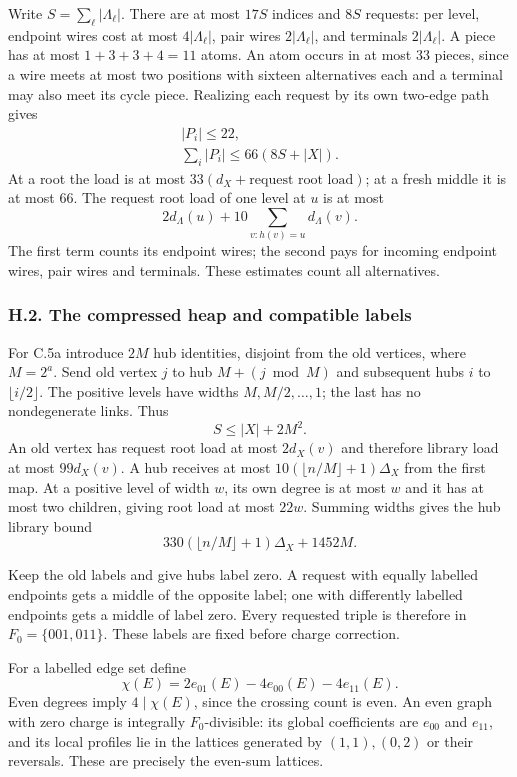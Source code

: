 \documentclass[english,11pt,a4paper]{article}
\begin{document}
Write \(S=\sum_\ell|\Lambda_\ell|\). There are at most \(17S\) indices and \(8S\) requests: per level, endpoint wires cost at most \(4|\Lambda_\ell|\), pair wires \(2|\Lambda_\ell|\), and terminals \(2|\Lambda_\ell|\). A piece has at most \(1+3+3+4=11\) atoms. An atom occurs in at most \(33\) pieces, since a wire meets at most two positions with sixteen alternatives each and a terminal may also meet its cycle piece. Realizing each request by its own two-edge path gives \[\begin{gathered}
|P_i|\le22,\\
\sum_i|P_i|\le66(8S+|X|).
\end{gathered}\] At a root the load is at most \(33(d_X+\text{request root load})\); at a fresh middle it is at most \(66\). The request root load of one level at \(u\) is at most \[2d_\Lambda(u)+10\sum_{v:h(v)=u}d_\Lambda(v).\] The first term counts its endpoint wires; the second pays for incoming endpoint wires, pair wires and terminals. These estimates count all alternatives.

\subsubsection{H.2. The compressed heap and compatible labels}\label{h.2.-the-compressed-heap-and-compatible-labels}

For C.5a introduce \(2M\) hub identities, disjoint from the old vertices, where \(M=2^a\). Send old vertex \(j\) to hub \(M+(j\bmod M)\) and subsequent hubs \(i\) to \(\lfloor i/2\rfloor\). The positive levels have widths \(M,M/2,\ldots,1\); the last has no nondegenerate links. Thus \[S\le|X|+2M^2.\] An old vertex has request root load at most \(2d_X(v)\) and therefore library load at most \(99d_X(v)\). A hub receives at most \(10(\lfloor n/M\rfloor+1)\Delta_X\) from the first map. At a positive level of width \(w\), its own degree is at most \(w\) and it has at most two children, giving root load at most \(22w\). Summing widths gives the hub library bound \[330(\lfloor n/M\rfloor+1)\Delta_X+1452M.\]

Keep the old labels and give hubs label zero. A request with equally labelled endpoints gets a middle of the opposite label; one with differently labelled endpoints gets a middle of label zero. Every requested triple is therefore in \(F_0=\{001,011\}\). These labels are fixed before charge correction.

For a labelled edge set define \[\chi(E)=2e_{01}(E)-4e_{00}(E)-4e_{11}(E).\] Even degrees imply \(4\mid\chi(E)\), since the crossing count is even. An even graph with zero charge is integrally \(F_0\)-divisible: its global coefficients are \(e_{00}\) and \(e_{11}\), and its local profiles lie in the lattices generated by \((1,1),(0,2)\) or their reversals. These are precisely the even-sum lattices.
\end{document}
